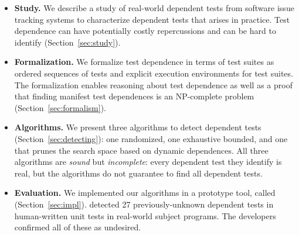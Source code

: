 \begin{itemize}

  \item \textbf{Study.} We describe a study of \dtnum real-world
  dependent tests from \repnum software issue tracking
  systems to characterize dependent tests that
  arises in practice.  Test dependence can have
  potentially costly repercussions and can be hard to identify
  (Section~\ref{sec:study}).

\item \textbf{Formalization.} We formalize test dependence
  in terms of test suites as ordered sequences of tests and explicit execution
  environments for test suites.  The formalization enables reasoning about test dependence
  as well as a proof that finding manifest test dependences is an NP-complete
  problem (Section~\ref{sec:formalism}).

  \item \textbf{Algorithms.} We present three algorithms
  to detect dependent tests (Section~\ref{sec:detecting}):
  one randomized, one exhaustive bounded, and one that prunes the search
  space based on dynamic dependences.
  All three algorithms are \emph{sound} but \emph{incomplete}:
  every dependent test they identify is real, but the algorithms
  do not guarantee to find all dependent tests. 

  \item \textbf{Evaluation.} We implemented our algorithms in a prototype
  tool, called \ourtool (Section~\ref{sec:impl}).
  \ourtool detected 27 previously-unknown dependent tests in human-written
  unit tests in \subjnum real-world subject programs.
  The developers confirmed all of these as
  undesired.

\end{itemize}




